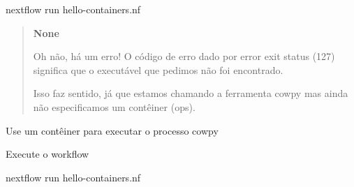 \documentclass[
  brazilian,
  letterpaper,
  DIV=11,
  numbers=noendperiod]{scrreprt}
\newenvironment{Shaded}{\begin{snugshade}}{\end{snugshade}}
\newcommand{\NormalTok}[1]{\textcolor[rgb]{0.00,0.23,0.31}{#1}}
\newcommand{\OperatorTok}[1]{\textcolor[rgb]{0.37,0.37,0.37}{#1}}
\newcommand{\SpecialStringTok}[1]{\textcolor[rgb]{0.13,0.47,0.30}{#1}}
\newcommand{\StringTok}[1]{\textcolor[rgb]{0.13,0.47,0.30}{#1}}
\begin{document}
\begin{tcolorbox}
\begin{Shaded}
\begin{Highlighting}[]
\NormalTok{nextflow run hello}\OperatorTok{{-}}\NormalTok{containers}\OperatorTok{.}\NormalTok{nf}
\end{Highlighting}
\end{Shaded}

\begin{quote}
\textbf{None}

Oh não, há um erro! O código de erro dado por error exit status (127)
significa que o executável que pedimos não foi encontrado.

Isso faz sentido, já que estamos chamando a ferramenta cowpy mas ainda
não especificamos um contêiner (ops).
\end{quote}

Use um contêiner para executar o processo cowpy

\begin{Shaded}
\end{Shaded}

Execute o workflow

\begin{Shaded}
\begin{Highlighting}[]
\NormalTok{nextflow run hello}\OperatorTok{{-}}\NormalTok{containers}\OperatorTok{.}\NormalTok{nf}
\end{Highlighting}
\end{Shaded}

\end{tcolorbox}
\end{document}
